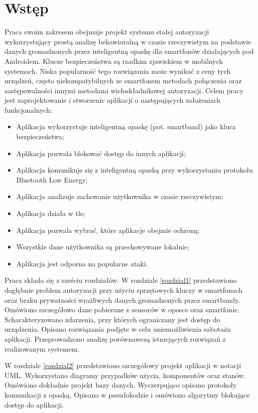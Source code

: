 \chapter{Wstęp}
\thispagestyle{chapterBeginStyle}
\label{wstep}

Praca swoim zakresem obejmuje projekt systemu stałej autoryzacji wykorzystujący prostą analizę behawioralną w czasie rzeczywistym na 
podstawie danych gromadzonych przez inteligentną opaskę dla smartfonów działających pod Androidem. Klucze bezpieczeństwa są rzadkim zjawiskiem w 
mobilnych systemach. Niska popularność tego rozwiązania może wynikać z ceny tych urządzeń, często niekompatybilnych ze smartfonem metodach połączenia oraz 
zastępowalności innymi metodami wieloskładnikowej autoryzacji.
\newline\newline
\indent Celem pracy jest zaprojektowanie i stworzenie aplikacji o następujących założeniach funkcjonalnych: 
\begin{itemize}
	\item Aplikacja wykorzystuje inteligentną opaskę (pot. smartband) jako klucz bezpieczeństwa;
	\item Aplikacja pozwala blokować dostęp do innych aplikacji;
    \item Aplikacja komunikuje się z inteligentną opaską przy wykorzystaniu protokołu Bluetooth Low Energy;
    \item Aplikacja analizuje zachowanie użytkownika w czasie rzeczywistym;
    \item Aplikacja działa w tle;
    \item Aplikacja pozwala wybrać, które aplikacje obejmie ochroną;
    \item Wszystkie dane użytkownika są przechowywane lokalnie;
    \item Aplikacja jest odporna na popularne ataki.
\end{itemize}

\indent Praca składa się z sześciu rozdziałów. W rozdziale \ref{rozdzial1} przedstawiono dogłębnie problem autoryzacji przy użyciu sprzętowych kluczy w smartfonach oraz braku prywatności wrażliwych danych gromadzonych przez smartbandy. 
Omówiono szczegółowo dane pobierane z sensorów w opasce oraz smartfonie. Scharakteryzowano zdarzenia, przy których ograniczany jest dostęp do 
urządzenia. Opisano rozwiązania podjęte w celu uniemożliwienia sabotażu aplikacji. Przeprowadzono analizę porównawczą istniejących rozwiązań z realizowanym 
systemem.

W rozdziale \ref{rozdzial2} przedstawiono szczegółowy projekt aplikacji w notacji UML. Wykorzystano diagramy przypadków użycia, komponentów oraz stanów. Omówiono dokładnie projekt bazy danych. Wyczerpująco opisano protokoły komunikacji z opaską. Opisano w pseudokodzie i omówiono algorytmy blokujące dostęp do aplikacji. 


